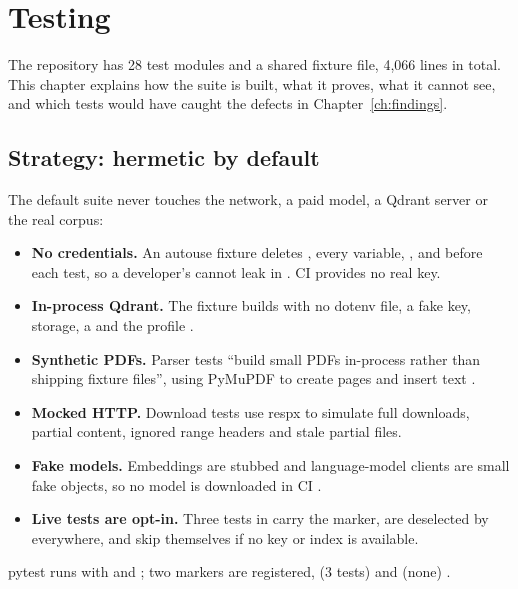 \chapter{Testing}
\label{ch:testing}

The repository has 28 test modules and a shared fixture file, 4,066 lines in total. This chapter explains how the suite is built, what it proves, what it cannot see, and which tests would have caught the defects in Chapter~\ref{ch:findings}.

\section{Strategy: hermetic by default}

The default suite never touches the network, a paid model, a Qdrant server or the real corpus:

\begin{itemize}
  \item \textbf{No credentials.} An autouse fixture deletes , every  variable, ,  and  before each test, so a developer's  cannot leak in . CI provides no real key.
  \item \textbf{In-process Qdrant.} The  fixture builds  with no dotenv file, a fake key,  storage, a  and the  profile .
  \item \textbf{Synthetic PDFs.} Parser tests \enquote{build small PDFs in-process rather than shipping fixture files}, using PyMuPDF to create pages and insert text .
  \item \textbf{Mocked HTTP.} Download tests use respx to simulate full downloads, partial content, ignored range headers and stale partial files.
  \item \textbf{Fake models.} Embeddings are stubbed and language-model clients are small fake objects, so no model is downloaded in CI .
  \item \textbf{Live tests are opt-in.} Three tests in  carry the  marker, are deselected by  everywhere, and skip themselves if no key or index is available.
\end{itemize}

pytest runs with  and ; two markers are registered,  (3 tests) and  (none) .

